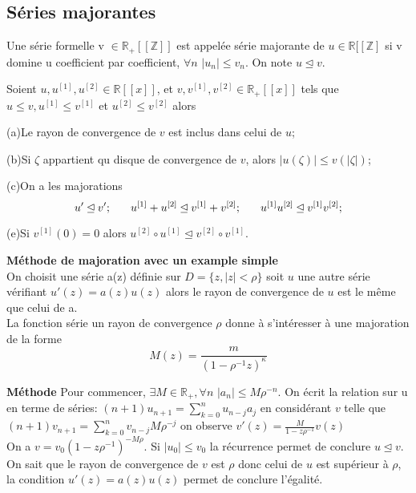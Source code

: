 \documentclass[a4paper,10.5pt]{article}
\begin{document}
	\subsection{Séries majorantes}
	
	\begin{definition} Une série formelle v $\in \mathbb{R}_{+}[[\mathbb{Z}]]$ est appelée série majorante de $ u \in \mathbb{R}[[\mathbb{Z}]$ si v domine u coefficient par coefficient, $\forall n$ $ |u_{n}|\leq v_{n}$. On note $u \unlhd v$.
	\end{definition}
	
	\begin{proposition} Soient $u,u^{[1]},u^{[2]}\in \mathbb{R}[[x]]$, et $v,v^{[1]},v^{[2]} \in \mathbb{R}_{+}[[x]]$ tels que $u\leq v,u^{[1]}\leq v^{[1]}$ et $u^{[2]}\leq v^{[2]}$ alors
		
		(a)Le rayon de convergence de $v$ est inclus dans celui de $u$;
		
		(b)Si $\zeta$ appartient qu disque de convergence de $v$, alors $|u(\zeta)|\leq v(|\zeta|)$;
		
		(c)On a les majorations
		\[u' \unlhd v'; \hspace{6mm} u^{[1]}+u^{[2]}\unlhd v^{[1]}+v^{[2]}; \hspace{6mm}u^{[1]}u^{[2]}\unlhd v^{[1]}v^{[2]}; \]
		
		(e)Si $v^{[1]}(0)=0$ alors $ u^{[2]} \circ u^{[1]} \unlhd v^{[2]}\circ v^{[1]}$.
		
	\end{proposition}
	
	\noindent\textbf{Méthode de majoration avec un example simple}\\
	On choisit une série a(z) définie sur $D=\{z,|z|<\rho\}$ soit $u$ une autre série vérifiant $u'(z)=a(z)u(z)$ alors le rayon de convergence de $u$ est le même que celui de a.\\
	La fonction série un rayon de convergence $\rho$ donne à s'intéresser à une majoration de la forme
	\[M(z)=\frac{m}{(1-\rho^{-1} z)^{\kappa}}\] 
	
	\noindent\textbf{Méthode} Pour commencer, $\exists M \in \mathbb{R}_{+}, \forall n$ $|a_{n}|\leq M \rho^{-n}$.
	On écrit la relation sur u en terme de séries: $(n+1)u_{n+1}=\sum_{k=0}^{n}u_{n-j}a_{j}$ en considérant $v$ telle que  $(n+1)v_{n+1}=\sum_{k=0}^{n}v_{n-j}M\rho^{-j}$ on observe $v'(z)=\frac{M}{1-z\rho^{-1}}v(z)$ \\
	On a $v=v_{0}(1-z\rho^{-1})^{-M\rho}$. Si $|u_{0}| \leq v_{0}$ la récurrence permet de conclure $ u\unlhd v$. On sait que le rayon de convergence de $v$ est $\rho$ donc celui de $u$ est supérieur à $\rho$, la condition $u'(z)=a(z)u(z)$ permet de conclure l'égalité.
	
\end{document}
